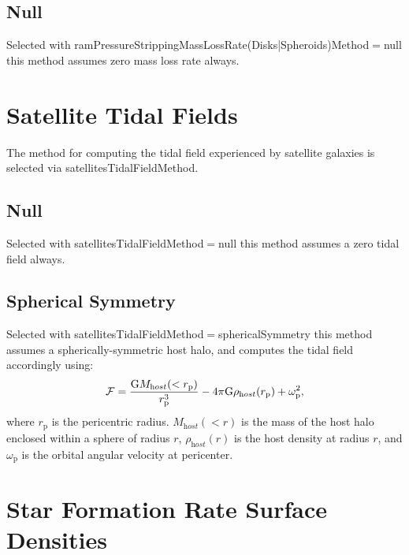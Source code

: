 \subsection{Null}

Selected with {\normalfont \ttfamily ramPressureStrippingMassLossRate(Disks|Spheroids)Method}$=${\normalfont \ttfamily null} this method assumes zero mass loss rate always.

\section{Satellite Tidal Fields}\label{sec:SatelliteTidalFields}

The method for computing the tidal field experienced by satellite galaxies is selected via {\normalfont \ttfamily satellitesTidalFieldMethod}.

\subsection{Null}

Selected with {\normalfont \ttfamily satellitesTidalFieldMethod}$=${\normalfont \ttfamily null} this method assumes a zero tidal field always.

\subsection{Spherical Symmetry}

Selected with {\normalfont \ttfamily satellitesTidalFieldMethod}$=${\normalfont \ttfamily sphericalSymmetry} this method assumes a spherically-symmetric host halo, and computes the tidal field accordingly using:
\begin{equation}
 \mathcal{F} = {{\mathrm G} M_{\mathrm host}(<r_{\mathrm p}) \over r_{\mathrm p}^3} - 4 \pi {\mathrm G} \rho_{\mathrm host}(r_{\mathrm p}) + \omega_{\mathrm p}^2,
\end{equation}
where $r_{\mathrm p}$ is the pericentric radius. $M_{\mathrm host}(<r)$ is the mass of the host halo enclosed within a sphere of radius $r$, $\rho_{\mathrm host}(r)$ is the host density at radius $r$, and $\omega_{\mathrm p}$ is the orbital angular velocity at pericenter.

\section{Star Formation Rate Surface Densities}\label{sec:StarFormationRateSurfaceDensity}

